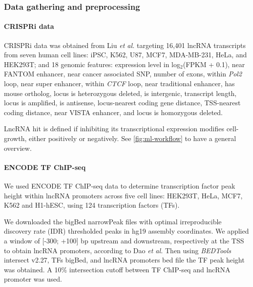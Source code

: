 \subsubsection{Data gathering and preprocessing}
\label{sec:ml_data}

\paragraph{CRISPRi data}
\label{sec:crispr_i_methods}

CRISPRi data was obtained from Liu \textit{et al.}\autocite{liu_2017_crispri} targeting 16,401 lncRNA transcripts from seven human cell lines: iPSC, K562, U87, MCF7, MDA-MB-231, HeLa, and HEK293T; and 18 genomic features: expression level in log$_2$(FPKM + 0.1), near FANTOM enhancer, near cancer associated SNP, number of exons, within \textit{Pol2} loop, near super enhancer, within \textit{CTCF} loop, near traditional enhancer, has mouse ortholog, locus is heterozygous deleted, is intergenic, transcript length, locus is amplified, is antisense, locus-nearest coding gene distance, TSS-nearest coding distance, near VISTA enhancer, and locus is homozygous deleted.

LncRNA hit is defined if inhibiting its transcriptional expression modifies cell-growth, either positively or negatively.\autocite{liu_2017_crispri} See \autoref{fig:ml-workflow} to have a general overview. 

\paragraph{ENCODE TF ChIP-seq}
\label{sec:encode_methods}

We used ENCODE TF ChIP-seq data\autocite{encode_2004,encode_2011_user} to determine transcription factor peak height within lncRNA promoters across five cell lines: HEK293T, HeLa, MCF7, K562 and H1-hESC, using 124 transcription factors (TFs).

We downloaded the bigBed narrowPeak files with optimal irreproducible discovery rate (IDR) thresholded peaks in hg19 assembly coordinates. We applied a window of [-300; +100] bp upstream and downstream, respectively at the TSS to obtain lncRNA promoters, according to Dao \textit{et al.}\autocite{dao_2017} Then using \textit{BEDTools} \autocite{quinlan_2010_bedtools} intersect v2.27, TFs bigBed, and lncRNA promoters bed file the TF peak height was obtained. A 10\% intersection cutoff between TF ChIP-seq and lncRNA promoter was used. 

